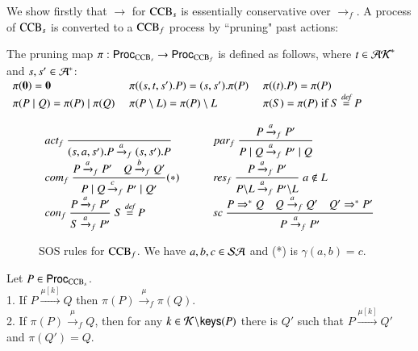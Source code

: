We show firstly that $\rightarrow$ for $\mbox{\rm CCB}_s$ is essentially conservative over 
$\xrightarrow{}_f$.
A process of $\mbox{\rm CCB}_s$ is converted to a $\mbox{\rm CCB}_f$ process by ``pruning" past actions:
\begin{definition}\label{def:pruning} \normalfont The pruning map 
$\pi: \mathsf{Proc}_{{\rm CCB}_s} \rightarrow \mathsf{Proc}_{{\rm CCB}_f}$ is defined as follows, where
$t\in \mathcal{AK}^*$ and  $s,s' \in \mathcal{A}^*$:
\\[10pt]
$\begin{array}{lll}
\pi(\Nil)=\Nil \; & \pi((s,t,s').P)=(s,s').\pi(P) \; & \pi((t).P)=\pi(P)\\%
\pi(P \paral Q)=\pi(P) \paral \pi(Q) \; & \pi(P \setminus L)=\pi(P) \setminus L \; & \pi(S)=\pi(P)\; \mbox{if }S \bydef P
\end{array}$
\end{definition}
\renewcommand{\arraystretch}{3}
\begin{figure}[t]
\[
\begin{array}{ll}
	\mbox{$act_f$}\
	\Rule
	{}
	{(s,a,s').P \xrightarrow{a}_f (s,s').P}
	\qquad &
	\mbox{$par_f$}\
	\Rule
	{P \xrightarrow{a}_f P'}
	{P \paral Q \xrightarrow{a}_f P' \paral Q}
	\\%
	\mbox{$com_f$}\
	\Rule
	{P \xrightarrow{a}_f P' \quad Q \xrightarrow{b}_f Q'}
	{P \paral Q \xrightarrow{c}_f P' \paral Q'} (*)
	\qquad &
\mathit{res}_f\
	\Rule
	{P \xrightarrow{a}_f P'}
	{P\backslash L \xrightarrow{a}_f P'\backslash L}
	\; a \notin L
	\\%
	\mbox{$con_f$}\
	\Rule
	{P \xrightarrow{a}_f P'}
	{S \xrightarrow{a}_f P'}
	\; S \bydef P
	\qquad &
	\mathit{sc}\
	\Rule
	{P \Rightarrow^* Q \quad Q \tran{a}_f Q' \quad Q' \Rightarrow^* P'}
	{P\tran{a}_f P'} 
\end{array}
\]
\caption{SOS rules for ${\rm CCB}_f$. We have $a,b,c \in \mathcal{SA}$ and (*) 
is $\gamma(a,b)=c$.}\label{fig:ccb-f}
\end{figure}
\renewcommand{\arraystretch}{1}

\begin{thm}[Conservation]\label{prop:strip}
Let $P \in \mathsf{Proc}_{{\rm CCB}_s}$.\\
1.  If $P \xrightarrow{\mu[k]} Q$ then $\pi(P) \xrightarrow{\mu}_f \pi(Q)$.\\
2.  If $\pi(P) \xrightarrow{\mu}_f Q$, then for any $k \in \mathcal{K} \!\setminus\!\mathsf{keys}(P)$ there is $Q'$ such that $P \xrightarrow{\mu[k]} Q'$ and $\pi(Q')=Q$.
\end{thm}

